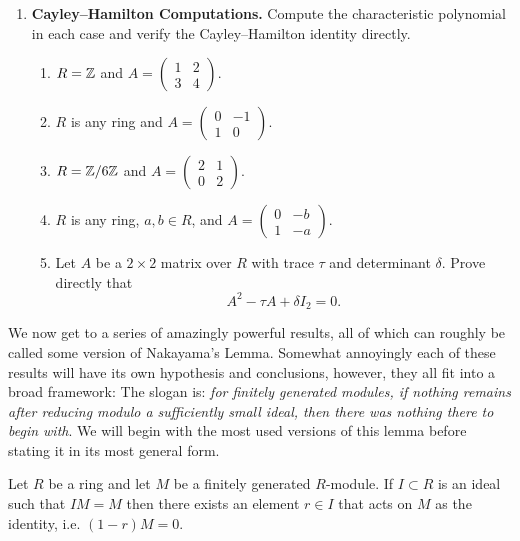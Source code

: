\documentclass[Notebook.tex]{subfiles}
\begin{document}
\begin{enumerate}[leftmargin=*, resume=problems]
\item \textbf{Cayley--Hamilton Computations.} Compute the characteristic polynomial in each case and verify the Cayley--Hamilton identity directly.
\begin{enumerate}
    \item $R=\mathbb Z$ and $A=\begin{pmatrix}1&2\\3&4\end{pmatrix}$.
    \item $R$ is any ring and $A=\begin{pmatrix}0&-1\\1&0\end{pmatrix}$.
    \item $R=\mathbb Z/6\mathbb Z$ and $A=\begin{pmatrix}2&1\\0&2\end{pmatrix}$.
    \item $R$ is any ring, $a,b\in R$, and $A=\begin{pmatrix}0&-b\\1&-a\end{pmatrix}$.
    \item Let $A$ be a $2\times 2$ matrix over $R$ with trace $\tau$ and determinant $\delta$. Prove directly that
    \[
    A^2-\tau A+\delta I_2=0.
    \]
\end{enumerate}


\end{enumerate}

\hrulefill

We now get to a series of amazingly powerful results, all of which can roughly be called some version of Nakayama's Lemma. Somewhat annoyingly each of these results will have its own hypothesis and conclusions, however, they all fit into a broad framework: The slogan is: \emph{for finitely generated modules, if nothing remains after reducing modulo a sufficiently small ideal, then there was nothing there to begin with}. We will begin with the most used versions of this lemma before stating it in its most general form.


\begin{lemma}
	Let $R$ be a ring and let $M$ be a finitely generated $R$-module. If $I \subset R$ is an ideal such that $IM=M$ then there exists an element $r\in I$ that acts on $M$ as the identity, i.e. $(1-r)M=0$.
\end{lemma}
\end{document}
